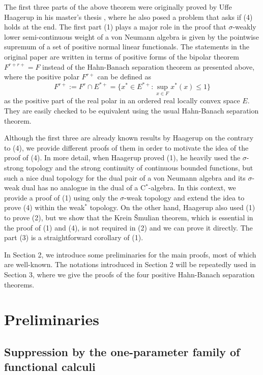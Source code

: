 \documentclass[noamsfonts,a4paper,10pt]{amsart}
\theoremstyle{plain}
\theoremstyle{definition}
\begin{document}
The first three parts of the above theorem were originally proved by Uffe Haagerup in his master's thesis \cite{MR380438}, where he also posed a problem that asks if (4) holds at the end.
The first part (1) plays a major role in the proof that $\sigma$-weakly lower semi-continuous weight of a von Neumann algebra is given by the pointwise supremum of a set of positive normal linear functionals.
The statements in the original paper are written in terms of positive forms of the bipolar theorem $F^{r+r+}=F$ instead of the Hahn-Banach separation theorem as presented above, where the positive polar $F^{r+}$ can be defined as
\[F^{r+}:=F^r\cap E^{*+}=\{x^*\in E^{*+}:\sup_{x\in F}x^*(x)\le1\}\]
as the positive part of the real polar in an ordered real locally convex space $E$.
They are easily checked to be equivalent using the usual Hahn-Banach separation theorem.

Although the first three are already known results by Haagerup on the contrary to (4), we provide different proofs of them in order to motivate the idea of the proof of (4).
In more detail, when Haagerup proved (1), he heavily used the $\sigma$-strong topology and the strong continuity of continuous bounded functions, but such a nice dual topology for the dual pair of a von Neumann algebra and its $\sigma$-weak dual has no analogue in the dual of a C$^*$-algebra.
In this context, we provide a proof of (1) using only the $\sigma$-weak topology and extend the idea to prove (4) within the weak$^*$ topology.
On the other hand, Haagerup also used (1) to prove (2), but we show that the Krein \v Smulian theorem, which is essential in the proof of (1) and (4), is not required in (2) and we can prove it directly.
The part (3) is a straightforward corollary of (1).

In Section 2, we introduce some preliminaries for the main proofs, most of which are well-known.
The notations introduced in Section 2 will be repeatedly used in Section 3, where we give the proofs of the four positive Hahn-Banach separation theorems.


\section{Preliminaries}


\subsection{Suppression by the one-parameter family of functional calculi}
\end{document}
